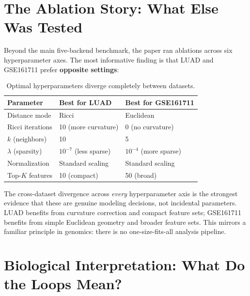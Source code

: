 \documentclass[11pt]{article}
\begin{document}
\section{The Ablation Story: What Else Was Tested}
\label{sec:ablation}

Beyond the main five-backend benchmark, the paper ran ablations across six hyperparameter axes. The most informative finding is that LUAD and GSE161711 prefer \textbf{opposite settings}:

\begin{table}[h]
\centering
\small
\begin{tabular}{p{3cm}p{4cm}p{4cm}}
\toprule
\textbf{Parameter} & \textbf{Best for LUAD} & \textbf{Best for GSE161711} \\
\midrule
Distance mode & Ricci & Euclidean \\
Ricci iterations & 10 (more curvature) & 0 (no curvature) \\
$k$ (neighbors) & 10 & 5 \\
$\lambda$ (sparsity) & $10^{-7}$ (less sparse) & $10^{-4}$ (more sparse) \\
Normalization & Standard scaling & Standard scaling \\
Top-$K$ features & 10 (compact) & 50 (broad) \\
\bottomrule
\end{tabular}
\caption{Optimal hyperparameters diverge completely between datasets.}
\end{table}

\begin{keyconcept}
The cross-dataset divergence across \emph{every} hyperparameter axis is the strongest evidence that these are genuine modeling decisions, not incidental parameters. LUAD benefits from curvature correction and compact feature sets; GSE161711 benefits from simple Euclidean geometry and broader feature sets. This mirrors a familiar principle in genomics: there is no one-size-fits-all analysis pipeline.
\end{keyconcept}

\section{Biological Interpretation: What Do the Loops Mean?}
\label{sec:biology}
\end{document}
